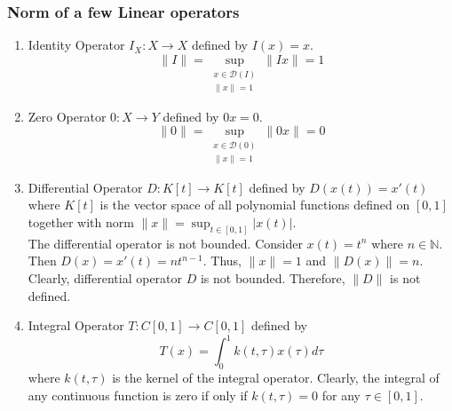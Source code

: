 \subsubsection{Norm of a few Linear operators}
\begin{enumerate}
	\item 
		Identity Operator $I_X : X \to X$ defined by $I(x) = x$.
		\[ \|I\| = \sup_{\substack{x \in \mathscr{D}(I)\\ \|x\| = 1}} \|Ix\| = 1 \]
	\item 
		Zero Operator $0 : X \to Y$ defined by $0x = 0$.
		\[ \|0\| = \sup_{\substack{x \in \mathscr{D}(0) \\ \|x\|=1}} \|0x\| = 0 \]
	\item 
		Differential Operator $D : K[t] \to K[t]$ defined by $D(x(t)) = x'(t)$ where $K[t]$ is the vector space of all polynomial functions defined on $[0,1]$ together with norm $\displaystyle \|x\| = \sup_{t \in [0,1]} |x(t)|$.\\

		The differential operator is not bounded.
		Consider $x(t) = t^n$ where $n \in \mathbb{N}$.
		Then $D(x) = x'(t) = nt^{n-1}$.
		Thus, $\|x\| = 1$ and $\|D(x)\| = n$.
		Clearly, differential operator $D$ is not bounded.	
		Therefore, $\|D\|$ is not defined.
	\item Integral Operator $T:C[0,1] \to C[0,1]$ defined by \[ T(x) = \int_0^1 k(t,\tau)x(\tau) d\tau \]
		where $k(t,\tau)$ is the kernel of the integral operator.
		Clearly, the integral of any continuous function is zero if only if $k(t,\tau) = 0$ for any $\tau \in [0,1]$.\\


\end{enumerate}
